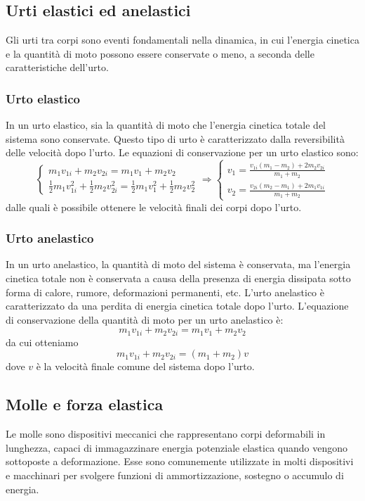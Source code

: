 \documentclass{article}
\begin{document}
\subsection{Urti elastici ed anelastici}
Gli urti tra corpi sono eventi fondamentali nella dinamica, in cui l'energia cinetica e la quantità di moto possono essere conservate o meno, a seconda delle caratteristiche dell'urto.
\subsubsection{Urto elastico}
In un urto elastico, sia la quantità di moto che l'energia cinetica totale del sistema sono conservate. Questo tipo di urto è caratterizzato dalla reversibilità delle velocità dopo l'urto. Le equazioni di conservazione per un urto elastico sono:
\[
\begin{cases}
    m_1v_{1i} + m_2v_{2i} = m_1v_1 + m_2v_2 \\
    \frac{1}{2}m_1v_{1i}^2 + \frac{1}{2}m_2v_{2i}^2 = \frac{1}{2}m_1v_{1}^2 + \frac{1}{2}m_2v_{2}^2
\end{cases}
\Rightarrow
\begin{cases}
    v_1 = \frac{v_{1i}(m_1 - m_2) +2m_2v_{2i}}{m_1 + m_2}\\
    v_2 = \frac{v_{2i}(m_2 - m_1) +2m_1v_{1i}}{m_1 + m_2}
\end{cases}
\]
dalle quali è possibile ottenere le velocità finali dei corpi dopo l'urto.
\subsubsection{Urto anelastico}
In un urto anelastico, la quantità di moto del sistema è conservata, ma l'energia cinetica totale non è conservata a causa della presenza di energia dissipata sotto forma di calore, rumore, deformazioni permanenti, etc. L'urto anelastico è caratterizzato da una perdita di energia cinetica totale dopo l'urto. L'equazione di conservazione della quantità di moto per un urto anelastico è:\[
    m_1v_{1i} + m_2v_{2i} = m_1v_1 + m_2v_2
\]
da cui otteniamo
\[
    m_1v_{1i} + m_2v_{2i} = (m_1 + m_2)v
\]
dove \( v \) è la velocità finale comune del sistema dopo l'urto.
\subsection{Molle e forza elastica}
Le molle sono dispositivi meccanici che rappresentano corpi deformabili in lunghezza, capaci di immagazzinare energia potenziale elastica quando vengono sottoposte a deformazione. Esse sono comunemente utilizzate in molti dispositivi e macchinari per svolgere funzioni di ammortizzazione, sostegno o accumulo di energia.
\end{document}
